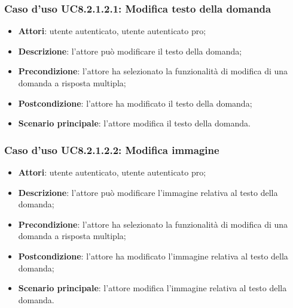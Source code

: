 \subsubsection{Caso d'uso UC8.2.1.2.1: Modifica testo della domanda}
	\begin{itemize}
		\item
			\textbf{Attori}: utente autenticato, utente autenticato pro;
		\item		
			\textbf{Descrizione}: l'attore può modificare il testo della domanda;
		\item
			\textbf{Precondizione}: l'attore ha selezionato la funzionalità di modifica di una domanda a risposta multipla;
		\item
			\textbf{Postcondizione}: l'attore ha modificato il testo della domanda;
		\item
			\textbf{Scenario principale}: l'attore modifica il testo della domanda. 
	 			
	\end{itemize}
	
\subsubsection{Caso d'uso UC8.2.1.2.2: Modifica immagine}
	\begin{itemize}
		\item
			\textbf{Attori}: utente autenticato, utente autenticato pro;
		\item		
			\textbf{Descrizione}: l'attore può modificare l'immagine relativa al testo della domanda;
		\item
			\textbf{Precondizione}: l'attore ha selezionato la funzionalità di modifica di una domanda a risposta multipla;
		\item
			\textbf{Postcondizione}: l'attore ha modificato l'immagine relativa al testo della domanda;
		\item
			\textbf{Scenario principale}: l'attore modifica l'immagine relativa al testo della domanda. 	
	\end{itemize}
	
	
